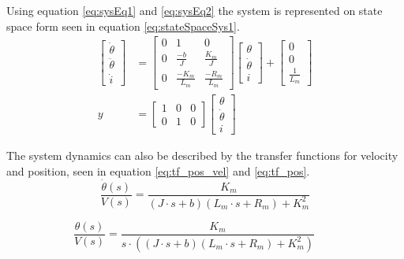 \documentclass[../../main.tex]{subfiles}
\begin{document}
Using equation \ref{eq:sysEq1} and \ref{eq:sysEq2} the system is represented on state space form seen in equation \ref{eq:stateSpaceSys1}.
\begin{equation}\label{eq:stateSpaceSys1}
\begin{split}
\begin{bmatrix}
\dot{\theta}\\
\ddot{\theta}\\
\dot{i}
\end{bmatrix} &=
\begin{bmatrix}
0 & 1 & 0 \\
0 & \frac{-b}{J} & \frac{K_m}{J}\\
0 & \frac{-K_m}{L_m} & \frac{-R_m}{L_m}
\end{bmatrix}
\begin{bmatrix}
\theta\\
\dot{\theta}\\
i
\end{bmatrix}
+ 
\begin{bmatrix}
0 \\
0 \\
\frac{1}{L_m}
\end{bmatrix} \\
    y &= 
    \begin{bmatrix}
    1 & 0 & 0\\
    0 & 1 & 0
    \end{bmatrix}
    \begin{bmatrix}
    \theta\\
    \dot{\theta}\\
    i
    \end{bmatrix}
    \end{split}
\end{equation}

The system dynamics can also be described by the transfer functions for velocity and position, seen in equation \ref{eq:tf_pos_vel} and \ref{eq:tf_pos}.
\begin{equation}\label{eq:tf_pos}
    \frac{\dot{\theta}(s)}{V(s)} = \frac{K_m}{(J\cdot s + b)(L_m\cdot s + R_m) + K_m^2}
\end{equation}

\begin{equation}
    \frac{\theta(s)}{V(s)} = \frac{K_m}{s\cdot((J\cdot s + b)(L_m\cdot s + R_m) + K_m^2)} \qquad 
\end{equation}
\end{document}

